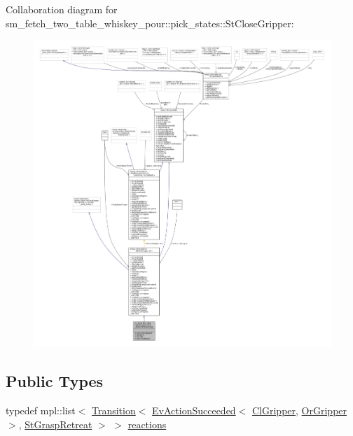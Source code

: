 Collaboration diagram for sm\+\_\+fetch\+\_\+two\+\_\+table\+\_\+whiskey\+\_\+pour\+:\+:pick\+\_\+states\+:\+:St\+Close\+Gripper\+:
\nopagebreak
\begin{figure}[H]
\begin{center}
\leavevmode
\includegraphics[width=350pt]{structsm__fetch__two__table__whiskey__pour_1_1pick__states_1_1StCloseGripper__coll__graph}
\end{center}
\end{figure}
\subsection*{Public Types}
\begin{DoxyCompactItemize}
\item 
typedef mpl\+::list$<$ \hyperlink{classsmacc_1_1Transition}{Transition}$<$ \hyperlink{structsmacc_1_1default__events_1_1EvActionSucceeded}{Ev\+Action\+Succeeded}$<$ \hyperlink{classsm__fetch__two__table__whiskey__pour_1_1cl__gripper_1_1ClGripper}{Cl\+Gripper}, \hyperlink{classsm__fetch__two__table__whiskey__pour_1_1OrGripper}{Or\+Gripper} $>$, \hyperlink{structsm__fetch__two__table__whiskey__pour_1_1pick__states_1_1StGraspRetreat}{St\+Grasp\+Retreat} $>$ $>$ \hyperlink{structsm__fetch__two__table__whiskey__pour_1_1pick__states_1_1StCloseGripper_ab33193fa41ba71af1f9e8337b9627a78}{reactions}
\end{DoxyCompactItemize}
